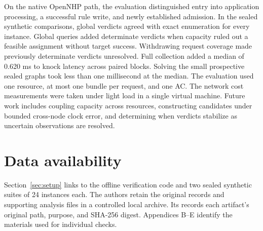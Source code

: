 On the native OpenNHP path, the evaluation distinguished entry into application processing, a successful rule write, and newly established admission. In the sealed synthetic comparisons, global verdicts agreed with exact enumeration for every instance. Global queries added determinate verdicts when capacity ruled out a feasible assignment without target success. Withdrawing request coverage made previously determinate verdicts unresolved. Full collection added a median of 0.620 ms to knock latency across paired blocks. Solving the small prospective sealed graphs took less than one millisecond at the median. The evaluation used one resource, at most one bundle per request, and one AC. The network cost measurements were taken under light load in a single virtual machine. Future work includes coupling capacity across resources, constructing candidates under bounded cross-node clock error, and determining when verdicts stabilize as uncertain observations are resolved.

\section*{Data availability}\label{data-availability}

Section~\ref{sec:setup} links to the offline verification code and two sealed synthetic suites of 24 instances each. The authors retain the original records and supporting analysis files in a controlled local archive. Its  records each artifact's original path, purpose, and SHA-256 digest. Appendices B--E identify the materials used for individual checks.
